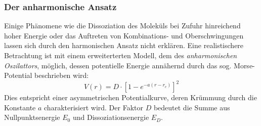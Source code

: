 \documentclass[12pt]{article}
\begin{document}
\subsubsection{Der anharmonische Ansatz}
Einige Phänomene wie die Dissoziation des Moleküls bei Zufuhr
hinreichend hoher Energie oder das Auftreten von Kombinations- und Oberschwingungen lassen sich durch den
harmonischen Ansatz nicht erklären. Eine realistischere Betrachtung ist mit einem erweiterterten Modell, dem des
\textit{anharmonischen Oszilattors}, möglich, dessen potentielle Energie annähernd durch das sog. Morse-Potential
beschrieben wird:
\begin{equation}
  V(r) = D \cdot [ 1- e^{-a(r-r_e)} ]^2
\end{equation}
Dies entspricht einer asymmetrischen Potentialkurve, deren Krümmung durch die Konstante $a$ charakterisiert wird. Der Faktor $D$
bedeutet die Summe aus Nullpunktsenergie $E _0$ und Dissoziationsenergie $E _D$.
\end{document}
